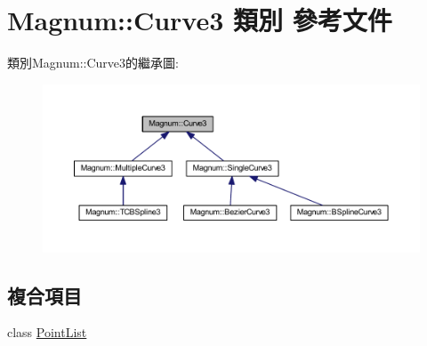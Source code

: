\hypertarget{class_magnum_1_1_curve3}{}\section{Magnum\+:\+:Curve3 類別 參考文件}
\label{class_magnum_1_1_curve3}


類別\+Magnum\+:\+:Curve3的繼承圖\+:\nopagebreak
\begin{figure}[H]
\begin{center}
\leavevmode
\includegraphics[width=350pt]{class_magnum_1_1_curve3__inherit__graph}
\end{center}
\end{figure}
\subsection*{複合項目}
\begin{DoxyCompactItemize}
\item 
class \hyperlink{class_magnum_1_1_curve3_1_1_point_list}{Point\+List}
\end{DoxyCompactItemize}
